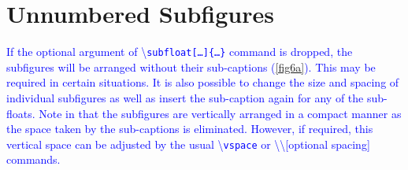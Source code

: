 \documentclass[phd]{ndsu-thesis-2022}
\newcommand\italk[1]{\textcolor{blue}{#1}}  %
\newcommand\cmd[1]{\textbackslash\texttt{#1}}  %
\begin{document}
\clearpage

\section{Unnumbered Subfigures}
\italk{If the optional argument of \cmd{subfloat[\ldots]\{\ldots\}} command is dropped, the subfigures will be arranged without their sub-captions (\cref{fig6a}). This may be required in certain situations. It is also possible to change the size and spacing of individual subfigures as well as insert the sub-caption again for any of the sub-floats. Note in \Cref{fig6a} that the subfigures are vertically arranged in a compact manner as the space taken by the sub-captions is eliminated. However, if required, this vertical space can be adjusted by the usual \cmd{vspace} or \textbackslash\textbackslash [optional spacing] commands.  
}
\end{document}
